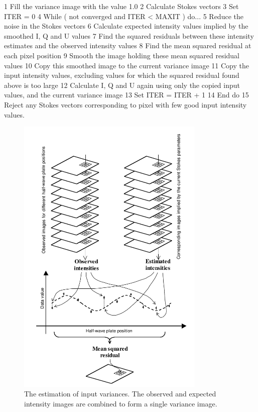 \documentclass[twoside,11pt]{starlink}
\begin{document}
\begin{terminalv}
1    Fill the variance image with the value 1.0
2    Calculate Stokes vectors
3    Set ITER = 0
4    While ( not converged and ITER < MAXIT ) do...
5       Reduce the noise in the Stokes vectors
6       Calculate expected intensity values implied by the smoothed
          I, Q and U values
7       Find the squared residuals between these intensity estimates
          and the observed intensity values
8       Find the mean squared residual at each pixel position
9       Smooth the image holding these mean squared residual values
10      Copy this smoothed image to the current variance image
11      Copy the input intensity values, excluding values for which
          the squared residual found above is too large
12      Calculate I, Q and U again using only the copied input values,
          and the current variance image
13      Set ITER = ITER + 1
14   End do
15   Reject any Stokes vectors corresponding to pixel with few good
       input intensity values.
\end{terminalv}

  \begin{figure}[htbp]
  \begin{center}
  \includegraphics[clip,width=0.8\textwidth]{sun223_figures/varest}
  \caption[The estimation of input variances.]{The estimation of input variances. The observed and expected
           intensity images are combined to form a single variance image.}
  \label{fig:varest}
  \end{center}
  \end{figure}
\end{document}

